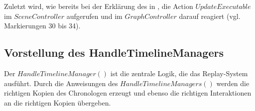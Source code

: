 Zuletzt wird, wie bereits bei der Erklärung des  in , die Action $UpdateExecutable$ im $SceneController$ aufgerufen und im $GraphController$ darauf reagiert (vgl. Markierungen 30 bis 34).

\subsection{Vorstellung des HandleTimelineManagers}\label{sec:handle-timeline-manager}
Der $HandleTimelineManager()$ ist die zentrale Logik, die das Replay-System ausführt. Durch die Anweisungen des $HandleTimelineManagers()$ werden die richtigen Kopien des Chronologen erzeugt und ebenso die richtigen Interaktionen an die richtigen Kopien übergeben.


